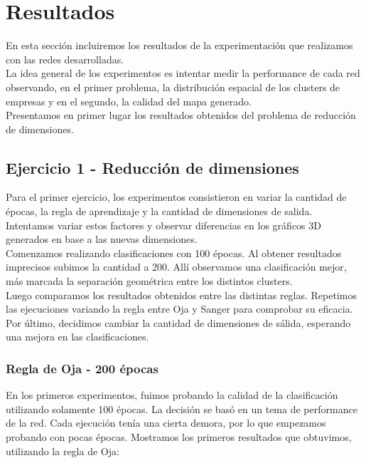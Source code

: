 \section{Resultados}
En esta sección incluiremos los resultados de la experimentación que realizamos con las redes desarrolladas.\\

La idea general de los experimentos es intentar medir la performance
de cada red observando, en el primer problema, la distribución espacial de los clusters de empresas y en el segundo, la calidad 
del mapa generado.\\

Presentamos en primer lugar los resultados obtenidos del problema de reducción de dimensiones.

\subsection{Ejercicio 1 - Reducción de dimensiones}

Para el primer ejercicio, los experimentos consistieron en variar la cantidad de épocas, la regla de aprendizaje y la cantidad de dimensiones de salida. Intentamos variar estos factores y observar diferencias en los gráficos 3D generados en base a las nuevas dimensiones.\\

Comenzamos realizando clasificaciones con 100 épocas. Al obtener resultados imprecisos subimos la cantidad a 200. Allí observamos una clasificación mejor, más marcada la separación geométrica entre los distintos clusters.\\

Luego comparamos los resultados obtenidos entre las distintas reglas. Repetimos las ejecuciones variando la regla entre Oja y Sanger para comprobar su eficacia.\\

Por último, decidimos cambiar la cantidad de dimensiones de sálida, esperando una mejora en las clasificaciones. 

\subsubsection{Regla de Oja - 200 épocas}
En los primeros experimentos, fuimos probando la calidad de la clasificación utilizando solamente 100 épocas. La decisión se basó en un tema de performance de la red. Cada ejecución tenía una cierta demora, por lo que empezamos probando con pocas épocas. Mostramos los primeros resultados que obtuvimos, utilizando la regla de Oja:

